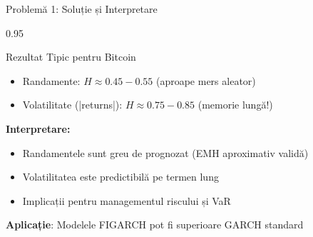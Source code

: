 \documentclass[9pt, aspectratio=169, t]{beamer}
\begin{document}
\begin{frame}{Problemă 1: Soluție și Interpretare}
    \begin{cminipage}{0.95\textwidth}
    \begin{exampleblock}{Rezultat Tipic pentru Bitcoin}
        \begin{itemize}\setlength{\itemsep}{0pt}
            \item Randamente: $H \approx 0.45-0.55$ (aproape mers aleator)
            \item Volatilitate (|returns|): $H \approx 0.75-0.85$ (memorie lungă!)
        \end{itemize}
    \end{exampleblock}

    \vspace{0.3cm}
    \textbf{Interpretare:}
    \begin{itemize}\setlength{\itemsep}{0pt}
        \item Randamentele sunt greu de prognozat (EMH aproximativ validă)
        \item Volatilitatea este predictibilă pe termen lung
        \item Implicații pentru managementul riscului și VaR
    \end{itemize}

    \vspace{0.2cm}
    \textbf{Aplicație}: Modelele FIGARCH pot fi superioare GARCH standard
    \end{cminipage}
\end{frame}
\end{document}
